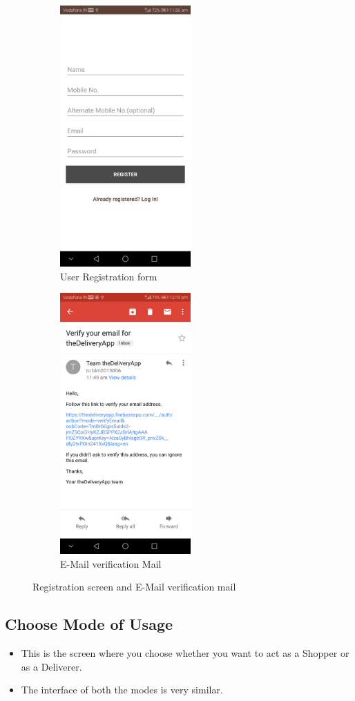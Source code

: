 \documentclass{report}
\begin{document}
\begin{figure}[h!]
\begin{subfigure}[b]{.3\textwidth}
\centering
\includegraphics[width=5cm]{signup.jpg}
\caption{\centering \tiny User Registration form}
\end{subfigure}
\begin{subfigure}[b]{.3\textwidth}
\centering
\includegraphics[width=5cm]{verify_email.jpg}
\caption{\centering \tiny E-Mail verification Mail}
\end{subfigure}
\caption{\tiny Registration screen and E-Mail verification mail} 
\label{fig:NASA_Logo}
\end{figure}


\subsection{Choose Mode of Usage}
\begin{itemize}
\item This is the screen where you choose whether you want to act as a Shopper or as a Deliverer.
\item The interface of both the modes is very similar.
\end{itemize}
\end{document}
